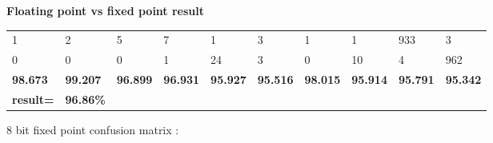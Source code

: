 \documentclass[xcolor=dvipsnames]{beamer}
\begin{document}
\begin{frame}{\bf Floating point vs fixed point result}
{\begin{table}[]
\begin{tabular}{llllllllll}
1                                       & 2                                       & 5               & 7               & 1               & 3               & 1               & 1               & 933             & 3               \\
0                                       & 0                                       & 0               & 1               & 24              & 3               & 0               & 10              & 4               & 962             \\
\textbf{98.673}                         & \textbf{99.207}                         & \textbf{96.899} & \textbf{96.931} & \textbf{95.927} & \textbf{95.516} & \textbf{98.015} & \textbf{95.914} & \textbf{95.791} & \textbf{95.342} \\
{\color[HTML]{FE0000} \textbf{result=}} & {\color[HTML]{FE0000} \textbf{96.86\%}} &                 &                 &                 &                 &                 &                 &                 &
\end{tabular}
\end{table}


8 bit fixed point confusion matrix :

}
\end{frame}
\end{document}
